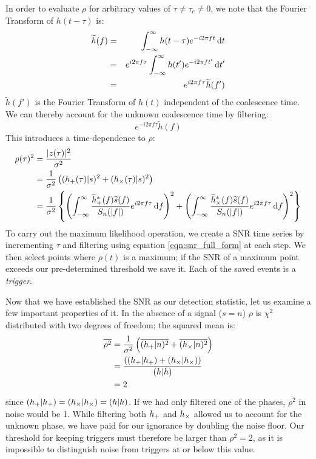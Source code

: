 In order to evaluate $\rho$ for arbitrary values of $\tau \neq \tau_c \neq 0$, we note that the Fourier Transform of $h(t-\tau)$ is: 
\begin{eqnarray}
\widetilde{h}(f) & = & \int_{-\infty}^{\infty} h(t-\tau) e^{-i 2\pi f t} \,\mathrm{d} t \nonumber \\
& = & e^{i 2\pi f \tau} \int_{-\infty}^{\infty} h(t') e^{-i 2\pi ft'} \,\mathrm{d} t' \nonumber \\
& = & e^{i 2\pi f \tau} \widetilde{h}(f')
\end{eqnarray}
$\widetilde{h}(f')$ is the Fourier Transform of $h(t)$ independent of the coalescence time. We can thereby account for the unknown coalescence time by filtering:
\begin{equation*}
e^{-i 2\pi f\tau} \widetilde{h}(f)
\end{equation*}
This introduces a time-dependence to $\rho$:
\begin{align}
\rho(\tau)^2 &= \frac{|z(\tau)|^2}{\sigma^2} \nonumber \\
 &= \frac{1}{\sigma^2}\left( (h_{\pls}(\tau)|s)^2 + (h_{\crs}(\tau)|s)^2 \right) \nonumber \\
\label{eqn:snr_full_form}
 &= \frac{1}{\sigma^2}\left\{ \left( \int_{-\infty}^{\infty} \frac{\widetilde{h}_{\pls}^{*}(f)\widetilde{s}(f)}{S_n(|f|)} e^{i 2\pi f\tau} \d f \right)^2 + \left( \int_{-\infty}^{\infty} \frac{\widetilde{h}_{\crs}^{*}(f)\widetilde{s}(f)}{S_n(|f|)} e^{i 2\pi f\tau} \d f \right)^2 \right\}
\end{align}
To carry out the maximum likelihood operation, we create a \ac{SNR} time series by incrementing $\tau$ and filtering using equation \ref{eqn:snr_full_form} at each step. We then select points where $\rho(t)$ is a maximum; if the \ac{SNR} of a maximum point exceeds our pre-determined threshold we save it. Each of the saved events is a \emph{trigger}.

Now that we have established the \ac{SNR} as our detection statistic, let us examine a few important properties of it. In the absence of a signal ($s = n$) $\rho$ is $\chi^2$ distributed with two degrees of freedom; the squared mean is:
\begin{align}
\overline{\rho^2} &= \frac{1}{\sigma^2}\left( \overline{(h_{+}|n)^2} + \overline{(h_{\times}|n)^2} \right) \nonumber \\
 &= \frac{ \left( (h_{+}|h_{+}) + (h_{\times}|h_{\times}) \right)}{(h|h)} \nonumber \\
 &= 2
\end{align}
since $(h_{+}|h_{+}) = (h_{\times}|h_{\times}) = (h|h)$. If we had only filtered one of the phases, $\overline{\rho^2}$ in noise would be 1. While filtering both $h_{+}$ and $h_{\times}$ allowed us to account for the unknown phase, we have paid for our ignorance by doubling the noise floor. Our threshold for keeping triggers must therefore be larger than $\rho^{2} = 2$, as it is impossible to distinguish noise from triggers at or below this value.

